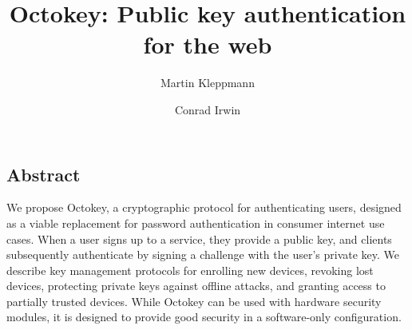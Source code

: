 \documentclass[letterpaper,twocolumn,10pt]{article}
\begin{document}
\date{} %
\title{\Large \bf Octokey: Public key authentication for the web}
\author{{\rm Martin Kleppmann} \and {\rm Conrad Irwin}}
\maketitle

\subsection*{Abstract}

We propose Octokey, a cryptographic protocol for authenticating users, designed as a viable
replacement for password authentication in consumer internet use cases. When a user signs up to a
service, they provide a public key, and clients subsequently authenticate by signing a challenge
with the user's private key. We describe key management protocols for enrolling new devices,
revoking lost devices, protecting private keys against offline attacks, and granting access to
partially trusted devices. While Octokey can be used with hardware security modules, it is designed
to provide good security in a software-only configuration.







{\footnotesize
    
    {}
}
\end{document}

